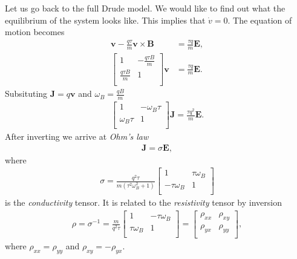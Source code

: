         Let us go back to the full Drude model. We would like to find out what the equilibrium of the system looks like. This implies that $\dot{v} =0$. The equation of motion becomes 
        \begin{align}
            \bm{v} - \frac{q \tau}{m}\bm{v}\times\bm{B}  &=\frac{\tau q}{m} \bm{E} ,\\
            \begin{bmatrix}
                1 & -\frac{q \tau B}{m} \\
                \frac{q \tau B}{m} & 1 \\
            \end{bmatrix} \bm{v} &= \frac{\tau q}{m} \bm{E}.
        \end{align}
        Subsituting $\bm{J} = q \bm{v}$ and $\omega_B = \frac{q B}{m}$
        \begin{align}
            \begin{bmatrix}
                1 & -\omega_B \tau \\
                \omega_B \tau & 1 \\
            \end{bmatrix}\bm{J} = \frac{\tau q^2}{m} \bm{E}.
        \end{align}
        After inverting we arrive at \textit{Ohm's law}
        \begin{align}
            \bm{J}=\sigma \bm{E}, \label{Ohms_Law}
        \end{align}
        where
        \begin{align}
            \sigma=\frac{q^2 \tau }{m \left(\tau ^2 \omega_B ^2+1\right)}
\begin{bmatrix}
 1 & \tau  \omega_B  \\
 -\tau  \omega_B  & 1 \\
\end{bmatrix}
        \end{align}
         is the \textit{conductivity} tensor. It is related to the \textit{resistivity} tensor by inversion
         \begin{align}
            \rho = \sigma^{-1}= \frac{m}{q^2 \tau } \begin{bmatrix}
 1 & -\tau  \omega_B  \\
 \tau  \omega_B  & 1 \\
            \end{bmatrix} = \begin{bmatrix}
                \rho_{xx} & \rho_{xy} \\
                \rho_{yx} & \rho_{yy} \\
            \end{bmatrix},
         \end{align}
         where $\rho_{xx} =\rho_{yy}$ and $\rho_{xy} = - \rho_{yx}$.

